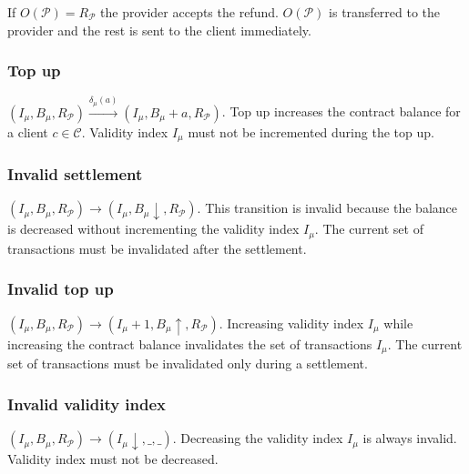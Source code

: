 \documentclass{llncs}
\begin{document}
If $O(\mathcal{P}) = R_\mathcal{P}$ the provider accepts the refund. $O(\mathcal{P})$ is transferred to the provider and the rest is sent to the client immediately.

\subsubsection{Top up} $(I_\mu, B_\mu,R_\mathcal{P}) \xrightarrow{\delta_\mu(a)} (I_\mu, B_\mu+a,R_\mathcal{P})$. Top up increases the contract balance for a client $c \in \mathcal{C}$. Validity index $I_\mu$ must not be incremented during the top up.

\subsubsection{Invalid settlement} $(I_\mu, B_\mu,R_\mathcal{P}) \rightarrow (I_\mu, B_\mu\downarrow,R_\mathcal{P})$. This transition is invalid because the balance is decreased without incrementing the validity index $I_\mu$. The current set of transactions must be invalidated after the settlement.

\subsubsection{Invalid top up} $(I_\mu, B_\mu,R_\mathcal{P}) \rightarrow (I_\mu+1, B_\mu\uparrow,R_\mathcal{P})$. Increasing validity index $I_\mu$ while increasing the contract balance invalidates the set of transactions $I_\mu$. The current set of transactions must be invalidated only during a settlement.

\subsubsection{Invalid validity index} $(I_\mu, B_\mu,R_\mathcal{P}) \rightarrow (I_\mu\downarrow, \_, \_)$. Decreasing the validity index $I_\mu$ is always invalid. Validity index must not be decreased.
\end{document}
